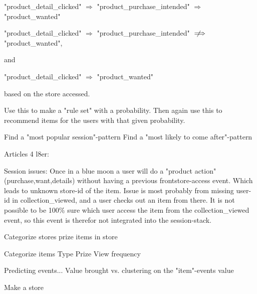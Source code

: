 "product\_detail\_clicked" $\Rightarrow$ "product\_purchase\_intended" $\Rightarrow$ "product\_wanted"

"product\_detail\_clicked" $\Rightarrow$ "product\_purchase\_intended" $\notimplies$ "product\_wanted",

and

"product\_detail\_clicked" $\Rightarrow$ "product\_wanted"

based on the store accessed.

Use this to make a "rule set" with a probability.
Then again use this to recommend items for the users with that given probability.

Find a "most popular session"-pattern
Find a "most likely to come after"-pattern


Articles 4 l8er:

Session issues:
Once in a blue moon a user will do a "product action" (purchase,want,details) without having a previous frontstore-access event. Which leads to unknown store-id of the item.
Issue is most probably from missing user-id in collection\_viewed, and a user checks out an item from there. It is not possible to be 100\% sure which user access the item from the collection\_viewed event, so this event is therefor not integrated into the session-stack.


Categorize stores
    prize
    items in store

Categorize items
    Type
    Prize
    View frequency

Predicting events...
    Value brought vs. clustering on the "item"-events value

Make a store




